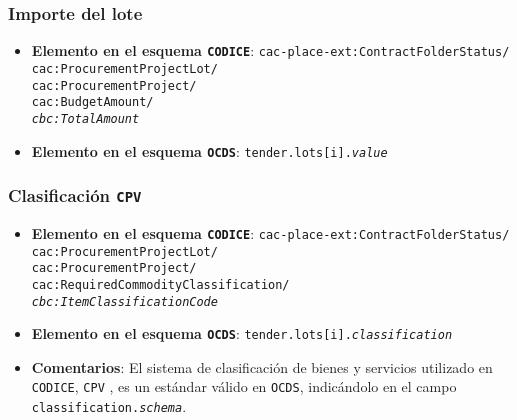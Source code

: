         \subsubsection{Importe del lote}
            \begin{itemize}
                \item \textbf{Elemento en el esquema \texttt{CODICE}}:
                    \tabto{7.6cm} \texttt{cac-place-ext:ContractFolderStatus/} \\
                    \tabto{7.6cm} \texttt{cac:ProcurementProjectLot/} \\
                    \tabto{7.6cm} \texttt{cac:ProcurementProject/} \\
                    \tabto{7.6cm} \texttt{cac:BudgetAmount/} \\
                    \tabto{7.6cm} \texttt{\textit{cbc:TotalAmount}}
                \item \textbf{Elemento en el esquema \texttt{OCDS}}:
                    \tabto{7.6cm} \texttt{tender.lots[i].\textit{value}}
            \end{itemize}
            
        \subsubsection{Clasificación \texttt{CPV}}
            \begin{itemize}
                \item \textbf{Elemento en el esquema \texttt{CODICE}}:
                    \tabto{7.6cm} \texttt{cac-place-ext:ContractFolderStatus/} \\
                    \tabto{7.6cm} \texttt{cac:ProcurementProjectLot/} \\
                    \tabto{7.6cm} \texttt{cac:ProcurementProject/} \\
                    \tabto{7.6cm} \texttt{cac:RequiredCommodityClassification/} \\
                    \tabto{7.6cm} \texttt{\textit{cbc:ItemClassificationCode}}
                \item \textbf{Elemento en el esquema \texttt{OCDS}}:
                    \tabto{7.6cm} \texttt{tender.lots[i].\textit{classification}}
                \item \textbf{Comentarios}: El sistema de clasificación de bienes y servicios utilizado en \texttt{CODICE}, \texttt{CPV} \cite{CR7}, es un estándar válido en \texttt{OCDS}, indicándolo en el campo \texttt{classification.\textit{schema}}.
            \end{itemize}

